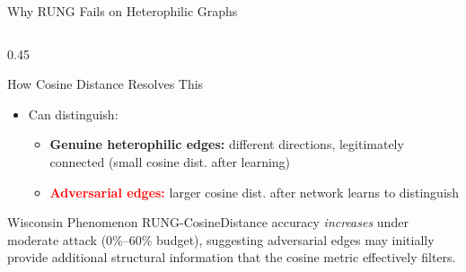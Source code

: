 \documentclass[aspectratio=169]{beamer}
\begin{document}
\begin{frame}{Why RUNG Fails on Heterophilic Graphs}
\begin{columns}[T]
\begin{column}{0.45\textwidth}
\begin{block}{How Cosine Distance Resolves This}
\begin{itemize}
          \item Can distinguish:
          \begin{itemize}
            \item \textcolor{runggreen}{\textbf{Genuine heterophilic edges:}} different directions, legitimately connected (small cosine dist. after learning)
            \item \textcolor{red}{\textbf{Adversarial edges:}} larger cosine dist. after network learns to distinguish
          \end{itemize}
        \end{itemize}
      \end{block}
      \vspace{6pt}
      \begin{block}{Wisconsin Phenomenon}
        RUNG-CosineDistance accuracy \emph{increases} under moderate attack (0\%--60\% budget), suggesting adversarial edges may initially provide additional structural information that the cosine metric effectively filters.
      \end{block}
    \end{column}
  \end{columns}
\end{frame}
\end{document}
